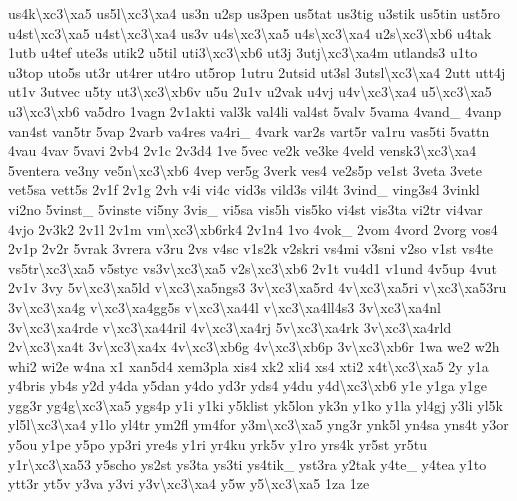{us4k\textbackslash{}xc3\textbackslash{}xa5 us5l\textbackslash{}xc3\textbackslash{}xa4 us3n u2sp us3pen us5tat us3tig u3stik us5tin ust5ro u4st\textbackslash{}xc3\textbackslash{}xa5 u4st\textbackslash{}xc3\textbackslash{}xa4 us3v u4s\textbackslash{}xc3\textbackslash{}xa5 u4s\textbackslash{}xc3\textbackslash{}xa4 u2s\textbackslash{}xc3\textbackslash{}xb6 u4tak 1utb u4tef ute3s utik2 u5til uti3\textbackslash{}xc3\textbackslash{}xb6 ut3j 3utj\textbackslash{}xc3\textbackslash{}xa4m utlands3 u1to u3top uto5s ut3r ut4rer ut4ro ut5rop 1utru 2utsid ut3sl 3utsl\textbackslash{}xc3\textbackslash{}xa4 2utt utt4j ut1v 3utvec u5ty ut3\textbackslash{}xc3\textbackslash{}xb6v u5u 2u1v u2vak u4vj u4v\textbackslash{}xc3\textbackslash{}xa4 u5\textbackslash{}xc3\textbackslash{}xa5 u3\textbackslash{}xc3\textbackslash{}xb6 va5dro 1vagn 2v1akti val3k val4li val4st 5valv 5vama 4vand\-\_\- 4vanp van4st van5tr 5vap 2varb va4res va4ri\-\_\- 4vark var2s vart5r va1ru vas5ti 5vattn 4vau 4vav 5vavi 2vb4 2v1c 2v3d4 1ve 5vec ve2k ve3ke 4veld vensk3\textbackslash{}xc3\textbackslash{}xa4 5ventera ve3ny ve5n\textbackslash{}xc3\textbackslash{}xb6 4vep ver5g 3verk ves4 ve2s5p ve1st 3veta 3vete vet5sa vett5s 2v1f 2v1g 2vh v4i vi4c vid3s vild3s vil4t 3vind\-\_\- ving3s4 3vinkl vi2no 5vinst\-\_\- 5vinste vi5ny 3vis\-\_\- vi5sa vis5h vis5ko vi4st vis3ta vi2tr vi4var 4vjo 2v3k2 2v1l 2v1m vm\textbackslash{}xc3\textbackslash{}xb6rk4 2v1n4 1vo 4vok\-\_\- 2vom 4vord 2vorg vos4 2v1p 2v2r 5vrak 3vrera v3ru 2vs v4sc v1s2k v2skri vs4mi v3sni v2so v1st vs4te vs5tr\textbackslash{}xc3\textbackslash{}xa5 v5styc vs3v\textbackslash{}xc3\textbackslash{}xa5 v2s\textbackslash{}xc3\textbackslash{}xb6 2v1t vu4d1 v1und 4v5up 4vut 2v1v 3vy 5v\textbackslash{}xc3\textbackslash{}xa5ld v\textbackslash{}xc3\textbackslash{}xa5ngs3 3v\textbackslash{}xc3\textbackslash{}xa5rd 4v\textbackslash{}xc3\textbackslash{}xa5ri v\textbackslash{}xc3\textbackslash{}xa53ru 3v\textbackslash{}xc3\textbackslash{}xa4g v\textbackslash{}xc3\textbackslash{}xa4gg5s v\textbackslash{}xc3\textbackslash{}xa44l v\textbackslash{}xc3\textbackslash{}xa4ll4s3 3v\textbackslash{}xc3\textbackslash{}xa4nl 3v\textbackslash{}xc3\textbackslash{}xa4rde v\textbackslash{}xc3\textbackslash{}xa44ril 4v\textbackslash{}xc3\textbackslash{}xa4rj 5v\textbackslash{}xc3\textbackslash{}xa4rk 3v\textbackslash{}xc3\textbackslash{}xa4rld 2v\textbackslash{}xc3\textbackslash{}xa4t 3v\textbackslash{}xc3\textbackslash{}xa4x 4v\textbackslash{}xc3\textbackslash{}xb6g 4v\textbackslash{}xc3\textbackslash{}xb6p 3v\textbackslash{}xc3\textbackslash{}xb6r 1wa we2 w2h whi2 wi2e w4na x1 xan5d4 xem3pla xis4 xk2 xli4 xs4 xti2 x4t\textbackslash{}xc3\textbackslash{}xa5 2y y1a y4bris yb4s y2d y4da y5dan y4do yd3r yds4 y4du y4d\textbackslash{}xc3\textbackslash{}xb6 y1e y1ga y1ge ygg3r yg4g\textbackslash{}xc3\textbackslash{}xa5 ygs4p y1i y1ki y5klist yk5lon yk3n y1ko y1la yl4gj y3li yl5k yl5l\textbackslash{}xc3\textbackslash{}xa4 y1lo yl4tr ym2fl ym4for y3m\textbackslash{}xc3\textbackslash{}xa5 yng3r ynk5l yn4sa yns4t y3or y5ou y1pe y5po yp3ri yre4s y1ri yr4ku yrk5v y1ro yrs4k yr5st yr5tu y1r\textbackslash{}xc3\textbackslash{}xa53 y5scho ys2st ys3ta ys3ti ys4tik\-\_\- yst3ra y2tak y4te\-\_\- y4tea y1to ytt3r yt5v y3va y3vi y3v\textbackslash{}xc3\textbackslash{}xa4 y5w y5\textbackslash{}xc3\textbackslash{}xa5 1za 1ze }
